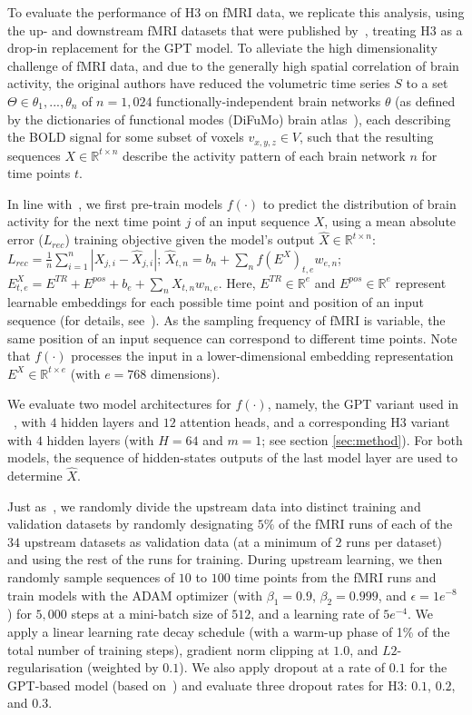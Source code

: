 To evaluate the performance of H3 on fMRI data, we replicate this analysis, using the up- and downstream fMRI datasets that were published by~\citep{thomas_fmri_2022}, treating H3 as a drop-in replacement for the GPT model. To alleviate the high dimensionality challenge of fMRI data, and due to the generally high spatial correlation of brain activity, the original authors have reduced the volumetric time series $S$ to a set $\Theta \in {\theta_1, ..., \theta_n}$ of $n=1,024$ functionally-independent brain networks $\theta$  (as defined by the dictionaries of functional modes (DiFuMo) brain atlas~\citep{dadi_2020_fine}), each describing the BOLD signal for some subset of voxels $v_{x,y,z} \in V$, such that the resulting sequences $X \in \mathbb{R}^{t \times n}$ describe the activity pattern of each brain network $n$ for time points $t$. 

In line with~\citep{thomas_fmri_2022}, we first pre-train models $f(\cdot)$ to predict the distribution of brain activity for the next time point $j$ of an input sequence $X$, using a mean absolute error ($L_{rec}$) training objective given the model's output $\hat{X} \in \mathbb{R}^{t \times n}$: $L_{rec} = \frac{1}{n} \sum_{i=1}^{n} |X_{j,i} - \hat{X}_{j,i}|$; $\hat{X}_{t,n} = b_n + \sum_n f(E^{X})_{t,e} w_{e,n}$; $E^{X}_{t,e} = E^{TR} + E^{pos} + b_e + \sum_n X_{t,n} w_{n,e}$. Here, $E^{TR} \in \mathbb{R}^{e}$ and $E^{pos} \in \mathbb{R}^{e}$ represent learnable embeddings for each possible time point and position of an input sequence (for details, see~\citep{thomas_fmri_2022}). As the sampling frequency of fMRI is variable, the same position of an input sequence can correspond to different time points. Note that $f(\cdot)$ processes the input in a lower-dimensional embedding representation $E^{X} \in \mathbb{R}^{t \times e}$ (with $e=768$ dimensions).

We evaluate two model architectures for $f(\cdot)$, namely, the GPT variant used in ~\citep{thomas_fmri_2022}, with $4$ hidden layers and $12$ attention heads, and a corresponding H3 variant with $4$ hidden layers (with $H=64$ and $m=1$; see section \ref{sec:method}). For both models, the sequence of hidden-states outputs of the last model layer are used to determine $\hat{X}$.

Just as~\citep{thomas_fmri_2022}, we randomly divide the upstream data into distinct training and validation datasets by randomly designating $5\%$ of the fMRI runs of each of the $34$ upstream datasets as validation data (at a minimum of $2$ runs per dataset) and using the rest of the runs for training. During upstream learning, we then randomly sample sequences of $10$ to $100$ time points from the fMRI runs and train models with the ADAM optimizer (with $\beta_1=0.9$, $\beta_2=0.999$, and $\epsilon=1e^{-8}$ ) for $5,000$ steps at a mini-batch size of $512$, and a learning rate of $5e^{-4}$. We apply a linear learning rate decay schedule (with a warm-up phase of 1\% of the total number of training steps), gradient norm clipping at $1.0$, and $L2$-regularisation (weighted by $0.1$). We also apply dropout at a rate of $0.1$ for the GPT-based model (based on~\citep{thomas_fmri_2022}) and evaluate three dropout rates for H3: $0.1$, $0.2$, and $0.3$. 

